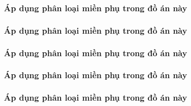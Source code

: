 \subsubsection{Áp dụng phân loại miền phụ trong đồ án này}

\subsubsection{Áp dụng phân loại miền phụ trong đồ án này}

\subsubsection{Áp dụng phân loại miền phụ trong đồ án này}

\subsubsection{Áp dụng phân loại miền phụ trong đồ án này}

\subsubsection{Áp dụng phân loại miền phụ trong đồ án này}

